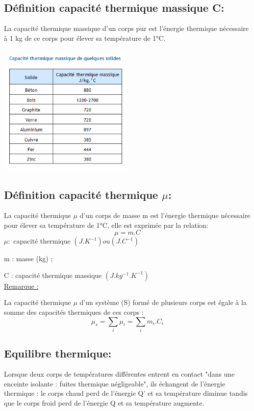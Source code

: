 \documentclass[12pt]{article}
\begin{document}
\subsection{Définition capacité thermique massique C:}
La capacité thermique massique d'un corps pur est l'énergie thermique nécessaire à 1 kg de
ce corps pour élever sa température de 1°C.
\begin{center}
   \includegraphics[width=0.5\textwidth]{./img/img01}
\end{center}

\subsection{Définition capacité thermique $\mu$:}
La capacité thermique $\mu$ d'un corps de masse m est l'énergie thermique nécessaire pour
élever sa température de 1°C, elle est exprimée par la relation:
$$\mu = m.C$$
$\mu :$ capacité thermique $(J.K^{-1} ) ou (J.C^{-1})$

m : masse (kg) ;

C : capacité thermique massique $(J.kg^{-1}.K^{-1})$
\\\underline{Remarque :}

La capacité thermique $\mu$ d'un système (S) formé de plusieurs corps est égale à la somme des
capacités thermiques de ces corps : $$\mu_s = \sum_i{\mu_i} = \sum_i{m_i.C_i}$$

\subsection{Equilibre thermique: }
Lorsque deux corps de températures différentes entrent en contact "dans une enceinte
isolante : fuites thermique négligeable", ils échangent de l’énergie thermique : le corps chaud
perd de l'énergie Q' et sa température diminue tandis que le corps froid perd de l'énergie Q et
sa température augmente.
\end{document}
